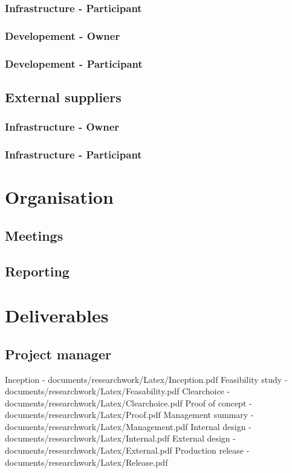 \documentclass[8pt]{article} %
\begin{document}
\subsubsection{Infrastructure - Participant}
\subsubsection{Developement - Owner}
\subsubsection{Developement - Participant}

\subsection{External suppliers}
\subsubsection{Infrastructure - Owner}
\subsubsection{Infrastructure - Participant}

\section{Organisation}

\subsection{Meetings}
\subsection{Reporting}

\section{Deliverables}

\subsection{Project manager}
Inception - documents/researchwork/Latex/Inception.pdf
Feasibility study - documents/researchwork/Latex/Feasability.pdf
Clearchoice - documents/researchwork/Latex/Clearchoice.pdf
Proof of concept - documents/researchwork/Latex/Proof.pdf
Management summary - documents/researchwork/Latex/Management.pdf
Internal design - documents/researchwork/Latex/Internal.pdf
External design - documents/researchwork/Latex/External.pdf
Production release -documents/researchwork/Latex/Release.pdf
\end{document}
